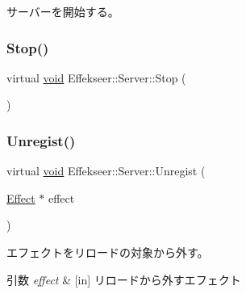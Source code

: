 サーバーを開始する。 

\mbox{\label{class_effekseer_1_1_server_ac41b09333e7d792489cbeef127df89f6}} 
\subsubsection{\texorpdfstring{Stop()}{Stop()}}
{\footnotesize\ttfamily virtual \mbox{\hyperlink{namespace_effekseer_ab34c4088e512200cf4c2716f168deb56}{void}} Effekseer\+::\+Server\+::\+Stop (\begin{DoxyParamCaption}{ }\end{DoxyParamCaption})\hspace{0.3cm}{\ttfamily [pure virtual]}}

\mbox{\label{class_effekseer_1_1_server_a81f7cfeac861a665a6d2905400735740}} 
\subsubsection{\texorpdfstring{Unregist()}{Unregist()}}
{\footnotesize\ttfamily virtual \mbox{\hyperlink{namespace_effekseer_ab34c4088e512200cf4c2716f168deb56}{void}} Effekseer\+::\+Server\+::\+Unregist (\begin{DoxyParamCaption}\item[{\mbox{\hyperlink{class_effekseer_1_1_effect}{Effect}} $\ast$}]{effect }\end{DoxyParamCaption})\hspace{0.3cm}{\ttfamily [pure virtual]}}



エフェクトをリロードの対象から外す。 


\begin{DoxyParams}{引数}
{\em effect} & \mbox{[}in\mbox{]} リロードから外すエフェクト \\
\hline
\end{DoxyParams}
\mbox{\label{class_effekseer_1_1_server_af841f04fb41ed36b888cb2f89c4c0771}} 
